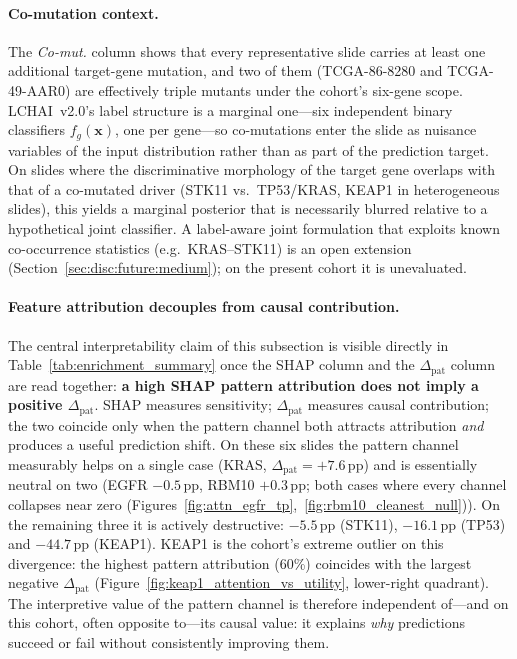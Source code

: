 \paragraph{Co-mutation context.}
The \emph{Co-mut.} column shows that every representative slide
carries at least one additional target-gene mutation, and two
of them (TCGA-86-8280 and TCGA-49-AAR0) are effectively triple
mutants under the cohort's six-gene scope.
LCHAI~v2.0's label structure is a marginal one---six
independent binary classifiers $f_g(\mathbf{x})$, one per
gene---so co-mutations enter the slide as nuisance variables
of the input distribution rather than as part of the
prediction target.
On slides where the discriminative morphology of the target
gene overlaps with that of a co-mutated driver (STK11 vs.\
TP53/KRAS, KEAP1 in heterogeneous slides), this yields a
marginal posterior that is necessarily blurred relative to a
hypothetical joint classifier.
A label-aware joint formulation that exploits known
co-occurrence statistics (e.g.\ KRAS--STK11) is an open
extension (Section~\ref{sec:disc:future:medium}); on the
present cohort it is unevaluated.

\paragraph{Feature attribution decouples from causal contribution.}
The central interpretability claim of this subsection is visible
directly in Table~\ref{tab:enrichment_summary} once the SHAP
column and the $\Delta_{\mathrm{pat}}$ column are read together:
\textbf{a high SHAP pattern attribution does not imply a
positive $\Delta_{\mathrm{pat}}$}.
SHAP measures sensitivity; $\Delta_{\mathrm{pat}}$ measures
causal contribution; the two coincide only when the pattern
channel both attracts attribution \emph{and} produces a
useful prediction shift.
On these six slides the pattern channel measurably helps on a
single case (KRAS, $\Delta_{\mathrm{pat}} = +7.6$\,pp) and is
essentially neutral on two (EGFR $-0.5$\,pp, RBM10 $+0.3$\,pp;
both cases where every channel collapses near zero
(Figures~\ref{fig:attn_egfr_tp},~\ref{fig:rbm10_cleanest_null})).
On the remaining three it is actively destructive:
$-5.5$\,pp (STK11), $-16.1$\,pp (TP53) and $-44.7$\,pp
(KEAP1).
KEAP1 is the cohort's extreme outlier on this divergence: the
highest pattern attribution (60\%) coincides with the largest
negative $\Delta_{\mathrm{pat}}$
(Figure~\ref{fig:keap1_attention_vs_utility}, lower-right
quadrant).
The interpretive value of the pattern channel is therefore
independent of---and on this cohort, often opposite to---its
causal value: it explains \emph{why} predictions succeed or
fail without consistently improving them.

